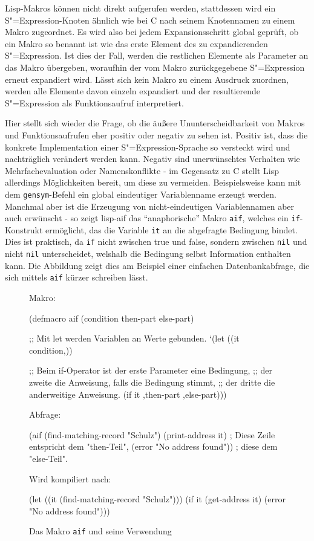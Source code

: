 \documentclass[11pt, a4paper, bibgerm]{book}
\newcommand\icode[1]{\lstinline?#1?}
\newcommand\abb{}
\newcommand{\sexp}{S"=Expression}
\begin{document}
Lisp-Makros können nicht direkt aufgerufen werden, stattdessen wird ein
\sexp{}-Knoten ähnlich wie bei C nach seinem Knotennamen zu einem Makro
zugeordnet. Es wird also bei jedem Expansionsschritt global geprüft, ob
ein Makro so benannt ist wie das erste Element des zu expandierenden
\sexp{}. Ist dies der Fall, werden die restlichen Elemente als Parameter
an das Makro übergeben, woraufhin der vom Makro zurückgegebene \sexp{}
erneut expandiert wird. Lässt sich kein Makro zu einem Ausdruck
zuordnen, werden alle Elemente davon einzeln expandiert und der
resultierende \sexp{} als Funktionsaufruf interpretiert.

Hier stellt sich wieder die Frage, ob die äußere Ununterscheidbarkeit
von Makros und Funktionsaufrufen eher positiv oder negativ zu sehen
ist. Positiv ist, dass die konkrete Implementation einer \sexp{}-Sprache
so versteckt wird und nachträglich verändert werden kann. Negativ sind
unerwünschtes Verhalten wie Mehrfachevaluation oder Namenskonflikte - im
Gegensatz zu C stellt Lisp allerdings Möglichkeiten bereit, um diese zu
vermeiden. Beispielsweise kann mit dem \icode{gensym}-Befehl ein global
eindeutiger Variablenname erzeugt werden. Manchmal aber ist die
Erzeugung von nicht-eindeutigen Variablennamen aber auch erwünscht - so
zeigt \abb{lisp-aif} das "`anaphorische"' Makro
\icode{aif}\cite{OnLisp}, welches ein \icode{if}-Konstrukt ermöglicht,
das die Variable \icode{it} an die abgefragte Bedingung bindet. Dies ist
praktisch, da \icode{if} nicht zwischen true und false, sondern zwischen
\icode{nil} und nicht \icode{nil} unterscheidet, welshalb die Bedingung
selbst Information enthalten kann. Die Abbildung zeigt dies am Beispiel
einer einfachen Datenbankabfrage, die sich mittels \icode{aif} kürzer
schreiben lässt.
\begin{figure}[htp]
  \centering
  \begin{code}
Makro:

(defmacro aif (condition then-part else-part)

  ;; Mit let werden Variablen an Werte gebunden.
  `(let ((it condition,))             

      ;; Beim if-Operator ist der erste Parameter eine Bedingung,
      ;; der zweite die Anweisung, falls die Bedingung stimmt,
      ;; der dritte die anderweitige Anweisung.
      (if it ,then-part ,else-part)))


Abfrage:

(aif (find-matching-record "Schulz")
  (print-address it)            ; Diese Zeile entspricht dem "then-Teil",
  (error "No address found"))   ; diese dem "else-Teil".


Wird kompiliert nach:

(let ((it (find-matching-record "Schulz")))
  (if it
      (get-address it)
      (error "No address found")))    
  \end{code}
  \caption{Das Makro \icode{aif} und seine Verwendung}
  \label{magicl:fig:lisp-aif}
\end{figure}
\end{document}
